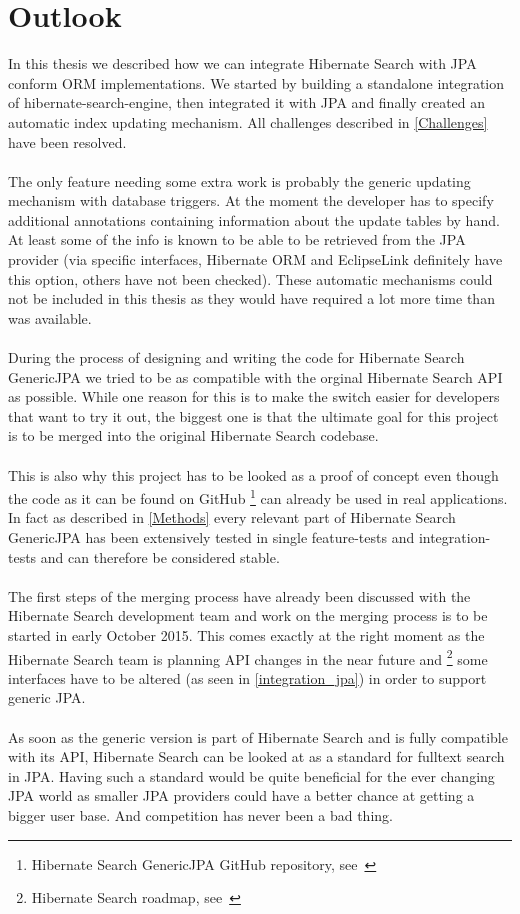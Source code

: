 \section{Outlook}\label{outlook}

In this thesis we described how we can integrate Hibernate Search with JPA conform ORM implementations. We started by building a standalone integration of hibernate-search-engine, then integrated it with JPA and finally created an automatic index updating mechanism. All challenges described in \ref{Challenges} have been resolved.
\\\\
The only feature needing some extra work is probably the generic updating mechanism with database triggers. At the moment the developer has to specify additional annotations containing information about the update tables by hand. At least some of the info is known to be able to be retrieved from the JPA provider (via specific interfaces, Hibernate ORM and EclipseLink definitely have this option, others have not been checked). These automatic mechanisms could not be included in this thesis as they would have required a lot more time than was available.
\\\\
During the process of designing and writing the code for Hibernate Search GenericJPA we tried to be as compatible with the orginal Hibernate Search API as possible. While one reason for this is to make the switch easier for developers that want to try it out, the biggest one is that the ultimate goal for this project is to be merged into the original Hibernate Search codebase.
\\\\
This is also why this project has to be looked as a proof of concept even though the code as it can be found on GitHub \footnote{Hibernate Search GenericJPA GitHub repository, see~\cite{hibernate_genericjpa_github}} can already be used in real applications. In fact as described in \ref{Methods} every relevant part of Hibernate Search GenericJPA has been extensively tested in single feature-tests and integration-tests and can therefore be considered stable. 
\\\\
The first steps of the merging process have already been discussed with the Hibernate Search development team and work on the merging process is to be started in early October 2015. This comes exactly at the right moment as the Hibernate Search team is planning API changes in the near future and \footnote{Hibernate Search roadmap, see~\cite{hibernate_search_roadmap}} some interfaces have to be altered (as seen in \ref{integration_jpa}) in order to support generic JPA.
\\\\
As soon as the generic version is part of Hibernate Search and is fully compatible with its API, Hibernate Search can be looked at as a standard for fulltext search in JPA. Having such a standard would be quite beneficial for the ever changing JPA world as smaller JPA providers could have a better chance at getting a bigger user base. And competition has never been a bad thing.